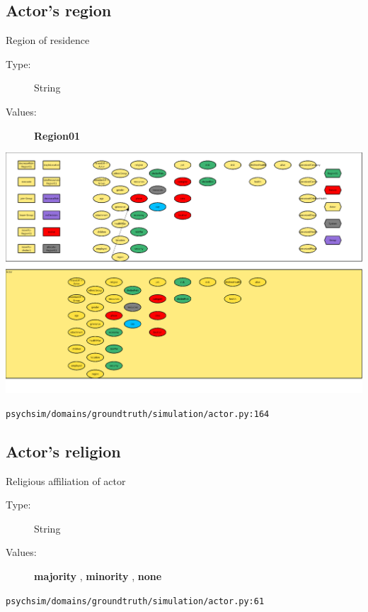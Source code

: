 \documentclass{article}%
\begin{document}
%
\subsection{Actor's region}%
\label{subsec:Actor's region}%
Region of residence%
\begin{description}%
\item[Type:]%
String%
\item[Values:]%
\textbf{Region01}%
\end{description}%
\includegraphics[width=\textwidth]{images/regionOfActor.png}%
\begin{flushleft}%
\verb|psychsim/domains/groundtruth/simulation/actor.py:164|%
\end{flushleft}

%
\subsection{Actor's religion}%
\label{subsec:Actor's religion}%
Religious affiliation of actor%
\begin{description}%
\item[Type:]%
String%
\item[Values:]%
\textbf{majority}%
, %
\textbf{minority}%
, %
\textbf{none}%
\end{description}%
\begin{flushleft}%
\verb|psychsim/domains/groundtruth/simulation/actor.py:61|%
\end{flushleft}

%
\end{document}
